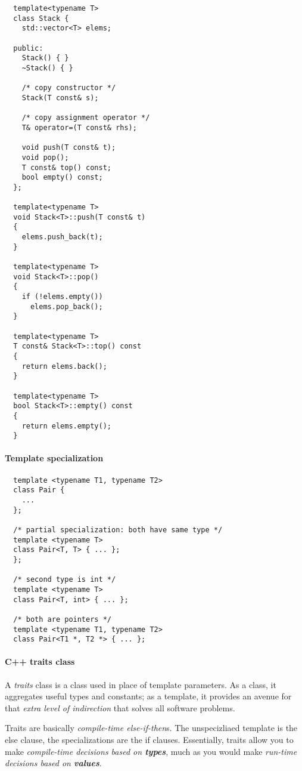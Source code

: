 \documentclass{memo}
\begin{document}
\begin{verbatim}
  template<typename T>
  class Stack {
    std::vector<T> elems;

  public:
    Stack() { }
    ~Stack() { }
 
    /* copy constructor */
    Stack(T const& s);

    /* copy assignment operator */
    T& operator=(T const& rhs);

    void push(T const& t);
    void pop();
    T const& top() const;
    bool empty() const;
  };

  template<typename T>
  void Stack<T>::push(T const& t)
  {
    elems.push_back(t);
  }

  template<typename T>
  void Stack<T>::pop()
  {
    if (!elems.empty())
      elems.pop_back();
  }

  template<typename T>
  T const& Stack<T>::top() const
  {
    return elems.back();
  }

  template<typename T>
  bool Stack<T>::empty() const
  {
    return elems.empty();
  }
\end{verbatim}

\paragraph{Template specialization}
\begin{verbatim}
  template <typename T1, typename T2>
  class Pair {
    ...
  };

  /* partial specialization: both have same type */
  template <typename T>
  class Pair<T, T> { ... };
  };

  /* second type is int */
  template <typename T>
  class Pair<T, int> { ... };

  /* both are pointers */
  template <typename T1, typename T2>
  class Pair<T1 *, T2 *> { ... };
\end{verbatim}


\paragraph{C++ traits class} A {\em traits\/} class is a class used in place
of template parameters. As a class, it aggregates useful types and constants;
as a template, it provides an avenue for that {\em extra level of indirection}
that solves all software problems. 

Traits are basically {\em compile-time else-if-then\/}s. The unspecizliaed
template is the else clause, the specializations are the if clauses. 
Essentially, traits allow you to make {\em compile-time decisions based on
  {\bfseries types\/}\/}, much as you would make {\em run-time decisions based
  on   {\bfseries values\/}\/}. 
\end{document}
